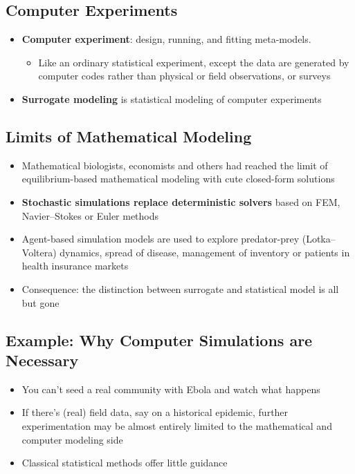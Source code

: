 \documentclass[
  letterpaper,
  DIV=11,
  numbers=noendperiod]{scrreprt}
\providecommand{\tightlist}{%
  \setlength{\itemsep}{0pt}\setlength{\parskip}{0pt}}\usepackage{longtable,booktabs,array}
\begin{document}
\subsection{Computer Experiments}\label{computer-experiments}

\begin{itemize}
\tightlist
\item
  \textbf{Computer experiment}: design, running, and fitting
  meta-models.

  \begin{itemize}
  \tightlist
  \item
    Like an ordinary statistical experiment, except the data are
    generated by computer codes rather than physical or field
    observations, or surveys
  \end{itemize}
\item
  \textbf{Surrogate modeling} is statistical modeling of computer
  experiments
\end{itemize}

\subsection{Limits of Mathematical
Modeling}\label{limits-of-mathematical-modeling}

\begin{itemize}
\tightlist
\item
  Mathematical biologists, economists and others had reached the limit
  of equilibrium-based mathematical modeling with cute closed-form
  solutions
\item
  \textbf{Stochastic simulations replace deterministic solvers} based on
  FEM, Navier--Stokes or Euler methods
\item
  Agent-based simulation models are used to explore predator-prey
  (Lotka--Voltera) dynamics, spread of disease, management of inventory
  or patients in health insurance markets
\item
  Consequence: the distinction between surrogate and statistical model
  is all but gone
\end{itemize}

\subsection{Example: Why Computer Simulations are
Necessary}\label{example-why-computer-simulations-are-necessary}

\begin{itemize}
\tightlist
\item
  You can't seed a real community with Ebola and watch what happens
\item
  If there's (real) field data, say on a historical epidemic, further
  experimentation may be almost entirely limited to the mathematical and
  computer modeling side
\item
  Classical statistical methods offer little guidance
\end{itemize}
\end{document}

